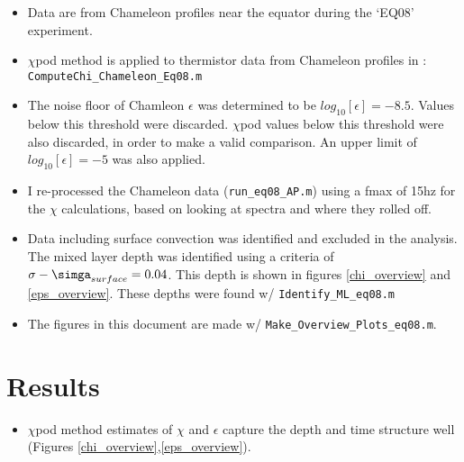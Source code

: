 \documentclass[11pt]{article}
\begin{document}
\begin{itemize}

\item Data are from Chameleon profiles near the equator during the `EQ08' experiment.

\item $\chi$pod method is applied to thermistor data from Chameleon profiles in : \verb+ComputeChi_Chameleon_Eq08.m+

\item The noise floor of Chamleon $\epsilon$ was determined to be $log_{10}[\epsilon]=-8.5$. Values below this threshold were discarded. $\chi$pod values below this threshold were also discarded, in order to make a valid comparison. An upper limit of $log_{10}[\epsilon]=-5$ was also applied.

\item I re-processed the Chameleon data (\verb+run_eq08_AP.m+) using a fmax of 15hz for the $\chi$ calculations, based on looking at spectra and where they rolled off.

\item Data including surface convection was identified and excluded in the analysis. The mixed layer depth was identified using a criteria of $\sigma -\simga_{surface}=0.04$. This depth is shown in figures \ref{chi_overview} and \ref{eps_overview}. These depths were found w/ \verb+Identify_ML_eq08.m+

\item  The figures in this document are made w/ \verb+Make_Overview_Plots_eq08.m+.

\end{itemize}







\clearpage
\section{Results}


\begin{itemize}

\item $\chi$pod method estimates of $\chi$ and $\epsilon$ capture the depth and time structure well (Figures \ref{chi_overview},\ref{eps_overview}).

\end{itemize}
\end{document}
